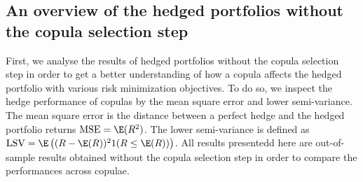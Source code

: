 \subsection{An overview of the hedged portfolios without the copula selection step}\label{subsec:HP1}
First, we analyse the results of hedged portfolios without the copula
selection step in order to get a better understanding of how a copula
affects the hedged portfolio with various risk minimization
objectives.
To do so, we inspect the hedge performance of copulas by
the mean square error and lower semi-variance.
The mean square error
is the distance between a perfect hedge and the hedged portfolio
returns $\operatorname{MSE}= \E(R^2)$.
The lower semi-variance is defined as 
$\operatorname{LSV}=\E \left( (R-\E(R))^2 1(R\leq \E(R)) \right)$.
All results presentedd here are out-of-sample results obtained without
the copula selection step in order to compare the performances across
copulae.

